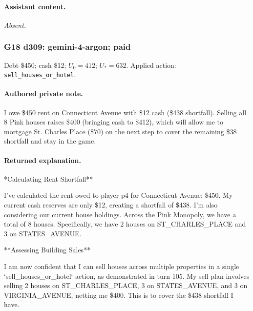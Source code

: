 \paragraph{Assistant content.}

\textit{Absent.}

\medskip

\subsubsection*{G18 d309: gemini-4-argon; paid}

Debt \$450; cash \$12; $U_0=412$; $U_*=632$. Applied action: \texttt{sell\_houses\_or\_hotel}.

\paragraph{Authored private note.}

{\small I owe \$450 rent on Connecticut Avenue with \$12 cash (\$438 shortfall). Selling all 8 Pink houses raises \$400 (bringing cash to \$412), which will allow me to mortgage St. Charles Place (\$70) on the next step to cover the remaining \$38 shortfall and stay in the game.\par}

\paragraph{Returned explanation.}

{\small **Calculating Rent Shortfall**
\par
I've calculated the rent owed to player p4 for Connecticut Avenue: \$450. My current cash reserves are only \$12, creating a shortfall of \$438. I'm also considering our current house holdings. Across the Pink Monopoly, we have a total of 8 houses. Specifically, we have 2 houses on ST\_CHARLES\_PLACE and 3 on STATES\_AVENUE.
\par

**Assessing Building Sales**
\par
I am now confident that I can sell houses across multiple properties in a single `sell\_houses\_or\_hotel` action, as demonstrated in turn 105. My sell plan involves selling 2 houses on ST\_CHARLES\_PLACE, 3 on STATES\_AVENUE, and 3 on VIRGINIA\_AVENUE, netting me \$400. This is to cover the \$438 shortfall I have.
\par

\par}

